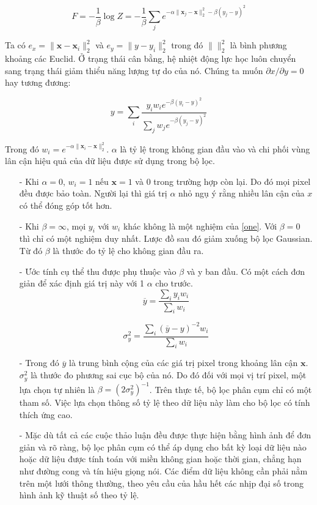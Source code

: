 \documentclass[12pt,letterpaper]{report}
\begin{document}
$$F=-\frac 1 \beta \log Z = -\frac 1 \beta \sum_j e^{-\alpha \|{\mathbf x_j-\mathbf x}\|_2^2-\beta(y_j-y)^2}$$
    
Ta có $e_x = \|\mathbf x - \mathbf x_i\|_2^2$ và $e_y=\|y-y_i\|_2^2$  trong đó $\| \|_2^2$  là bình phương khoảng các Euclid. Ở trạng thái cân bằng, hệ nhiệt động lực học luôn chuyển sang trạng thái giảm thiểu năng lượng tự do của nó. Chúng ta muốn $\partial x/\partial y =0$ hay tương đương:

 \begin{equation}\label{one}
 y=\sum_i \frac {y_iw_ie^{-\beta(y_i-y)^2}}{\sum_j w_je^{-\beta(y_j-y)^2}}
 \end{equation}

Trong đó $w_i = e^{-\alpha\|\mathbf x_i-\mathbf x\|_2^2}$. $\alpha$ là tỷ lệ trong không gian đầu vào và chi phối vùng lân cận hiệu quả của dữ liệu được sử dụng trong bộ lọc.

    
\begin{itemize}
	\item[-] Khi $\alpha=0$, $w_i = 1$ nếu $\mathbf x = 1$ và $0$ trong trường hợp còn lại. Do đó mọi pixel đều được bảo toàn. Người lại thì giá trị $\alpha$ nhỏ ngụ ý rằng nhiều lân cận của $x$ có thể đóng góp tốt hơn.
	\item[-] Khi $\beta=\infty$, mọi $y_i$ với $w_i$ khác không là một nghiệm của \eqref{one}. Với $\beta=0$ thì chỉ có một nghiệm duy nhất. Lược đồ sau đó giảm xuống bộ lọc Gaussian. Từ đó $\beta$ là thước đo tỷ lệ cho không gian đầu ra.
	\item[-] Ước tính cụ thể thu được phụ thuộc vào $\beta$ và y ban đầu. Có một cách đơn giản để xác định giá trị này với 1 $\alpha$ cho trước.
	      $$\overline y=\frac{\sum_i y_iw_i}{\sum_i w_i}$$
	          	
	      $$\sigma_y^2=\frac{\sum_i(\overline y-y)^{-2}w_i}{\sum_i w_i}$$
	\item[-] Trong đó $\overline y$ là trung bình cộng của các giá trị pixel trong khoảng lân cận $\mathbf x$. $\sigma_y^2$ là thước đo phương sai cục bộ của nó. Do đó đối với mọi vị trí pixel, một lựa chọn tự nhiên là $\beta=(2\sigma_y^2)^{-1}$. Trên thực tế, bộ lọc phân cụm chỉ có một tham số. Việc lựa chọn thông số tỷ lệ theo dữ liệu này làm cho bộ lọc có tính thích ứng cao.
	\item[-] Mặc dù tất cả các cuộc thảo luận đều được thực hiện bằng hình ảnh để đơn giản và rõ ràng, bộ lọc phân cụm có thể áp dụng cho bất kỳ loại dữ liệu nào hoặc dữ liệu được tính toán với miền không gian hoặc thời gian, chẳng hạn như đường cong và tín hiệu giọng nói. Các điểm dữ liệu không cần phải nằm trên một lưới thông thường, theo yêu cầu của hầu hết các nhịp đại số trong hình ảnh kỹ thuật số theo tỷ lệ.
\end{itemize}
    
\end{document}
